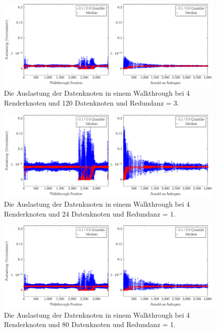 \begin{figure}
\centering
\includegraphics[scale=0.75]{images/diag_cCol_red3_render4_data120_2x.pdf}
\caption{\label{fig:eval:cCol6}Die Auslastung der Datenknoten in einem Walkthrough bei 4 Renderknoten und 120 Datenknoten und Redundanz = 3.}
\end{figure}

\begin{figure}
\centering
\includegraphics[scale=0.75]{images/diag_cCol_red1_render4_data24_2x.pdf}
\caption{\label{fig:eval:cCol7}Die Auslastung der Datenknoten in einem Walkthrough bei 4 Renderknoten und 24 Datenknoten und Redundanz = 1.}
\end{figure}

\begin{figure}
\centering
\includegraphics[scale=0.75]{images/diag_cCol_red1_render4_data80_2x.pdf}
\caption{\label{fig:eval:cCol8}Die Auslastung der Datenknoten in einem Walkthrough bei 4 Renderknoten und 80 Datenknoten und Redundanz = 1.}
\end{figure}

